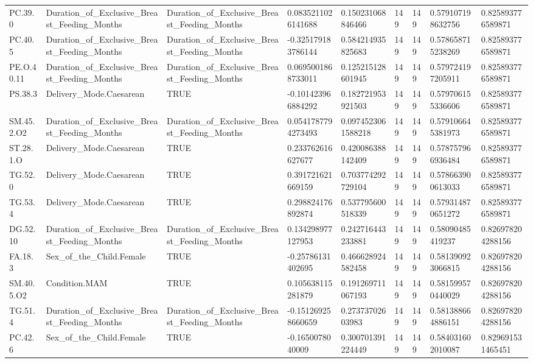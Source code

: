 \begin{longtable}{lllllllll}
PC.39.0 & Duration\_of\_Exclusive\_Breast\_Feeding\_Months & Duration\_of\_Exclusive\_Breast\_Feeding\_Months & 0.0835211026141688 & 0.150231068846466 & 149 & 149 & 0.579107198632756 & 0.825893776589871 \\
PC.40.5 & Duration\_of\_Exclusive\_Breast\_Feeding\_Months & Duration\_of\_Exclusive\_Breast\_Feeding\_Months & -0.325179183786144 & 0.584214935825683 & 149 & 149 & 0.578658715238269 & 0.825893776589871 \\
PE.O.40.11 & Duration\_of\_Exclusive\_Breast\_Feeding\_Months & Duration\_of\_Exclusive\_Breast\_Feeding\_Months & 0.0695001868733011 & 0.125215128601945 & 149 & 149 & 0.579724197205911 & 0.825893776589871 \\
PS.38.3 & Delivery\_Mode.Caesarean & TRUE & -0.101423966884292 & 0.182721953921503 & 149 & 149 & 0.579706155336606 & 0.825893776589871 \\
SM.45.2.O2 & Duration\_of\_Exclusive\_Breast\_Feeding\_Months & Duration\_of\_Exclusive\_Breast\_Feeding\_Months & 0.0541787794273493 & 0.0974523061588218 & 149 & 149 & 0.579106645381973 & 0.825893776589871 \\
ST.28.1.O & Delivery\_Mode.Caesarean & TRUE & 0.233762616627677 & 0.420086388142409 & 149 & 149 & 0.578757966936484 & 0.825893776589871 \\
TG.52.0 & Delivery\_Mode.Caesarean & TRUE & 0.391721621669159 & 0.703774292729104 & 149 & 149 & 0.578663900613033 & 0.825893776589871 \\
TG.53.4 & Delivery\_Mode.Caesarean & TRUE & 0.298824176892874 & 0.537795600518339 & 149 & 149 & 0.579314870651272 & 0.825893776589871 \\
DG.52.10 & Duration\_of\_Exclusive\_Breast\_Feeding\_Months & Duration\_of\_Exclusive\_Breast\_Feeding\_Months & 0.134298977127953 & 0.242716443233881 & 149 & 149 & 0.58090485419237 & 0.826978204288156 \\
FA.18.3 & Sex\_of\_the\_Child.Female & TRUE & -0.25786131402695 & 0.466628924582458 & 149 & 149 & 0.581390923066815 & 0.826978204288156 \\
SM.40.5.O2 & Condition.MAM & TRUE & 0.105638115281879 & 0.191269711067193 & 149 & 149 & 0.581599570440029 & 0.826978204288156 \\
TG.51.4 & Duration\_of\_Exclusive\_Breast\_Feeding\_Months & Duration\_of\_Exclusive\_Breast\_Feeding\_Months & -0.151269258660659 & 0.27373702603983 & 149 & 149 & 0.581388664886151 & 0.826978204288156 \\
PC.42.6 & Sex\_of\_the\_Child.Female & TRUE & -0.1650078040009 & 0.300701391224449 & 149 & 149 & 0.584031602010087 & 0.829691531465451 \\

\end{longtable}
